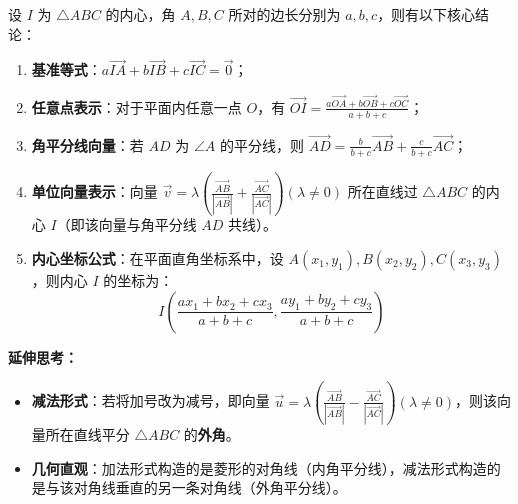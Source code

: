 \begin{statementbox}
设 $I$ 为 $\triangle ABC$ 的内心，角 $A, B, C$ 所对的边长分别为 $a, b, c$，则有以下核心结论：
\begin{enumerate}
    \item \textbf{基准等式}：$a\vec{IA} + b\vec{IB} + c\vec{IC} = \vec{0}$；
    \item \textbf{任意点表示}：对于平面内任意一点 $O$，有 $\vec{OI} = \frac{a\vec{OA} + b\vec{OB} + c\vec{OC}}{a+b+c}$；
    \item \textbf{角平分线向量}：若 $AD$ 为 $\angle A$ 的平分线，则 $\vec{AD} = \frac{b}{b+c}\vec{AB} + \frac{c}{b+c}\vec{AC}$；
    \item \textbf{单位向量表示}：向量 $\vec{v} = \lambda \left( \frac{\vec{AB}}{|\vec{AB}|} + \frac{\vec{AC}}{|\vec{AC}|} \right) (\lambda \neq 0)$ 所在直线过 $\triangle ABC$ 的内心 $I$（即该向量与角平分线 $AD$ 共线）。
    \item \textbf{内心坐标公式}：在平面直角坐标系中，设 $A(x_1, y_1), B(x_2, y_2), C(x_3, y_3)$，则内心 $I$ 的坐标为：
    \[ I\left( \frac{ax_1 + bx_2 + cx_3}{a+b+c}, \frac{ay_1 + by_2 + cy_3}{a+b+c} \right) \]
\end{enumerate}
\tcbline %

\textbf{延伸思考：}
\begin{itemize}
    \item \textbf{减法形式}：若将加号改为减号，即向量 $\vec{u} = \lambda \left( \frac{\vec{AB}}{|\vec{AB}|} - \frac{\vec{AC}}{|\vec{AC}|} \right) (\lambda \neq 0)$，则该向量所在直线平分 $\triangle ABC$ 的\textbf{外角}。
    \item \textbf{几何直观}：加法形式构造的是菱形的对角线（内角平分线），减法形式构造的是与该对角线垂直的另一条对角线（外角平分线）。
\end{itemize}
\end{statementbox}